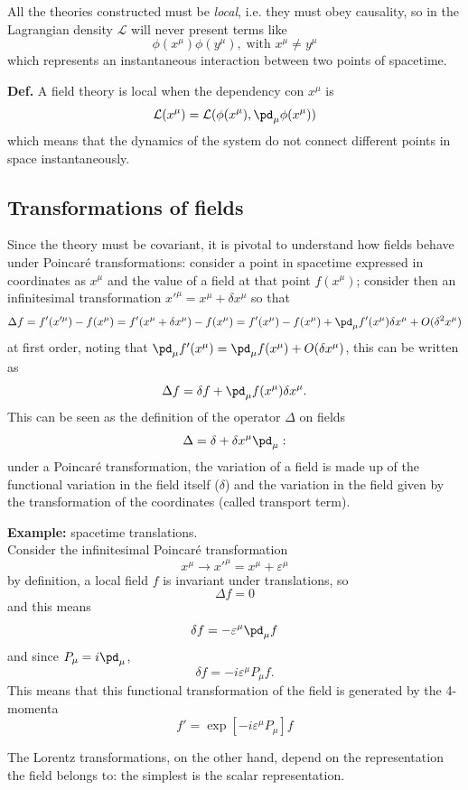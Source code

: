 All the theories constructed must be \textit{local}, i.e. they must obey causality,
so in the Lagrangian density $\mathcal{L}$ will never present terms like
$$\phi(x^\mu)\phi(y^\mu),\;\text{with }x^\mu\neq y^\mu$$
which represents an instantaneous interaction between two points of spacetime.

\textbf{Def.} A field theory is local when the dependency con $x^\mu$ is
$$\mathcal{L}(x^\mu) =\mathcal{L}(\phi(x^\mu),\pd_\mu\phi(x^\mu))$$
which means that the dynamics of the system do not connect different points in space
instantaneously.

\subsection{Transformations of fields}
Since the theory must be covariant, it is pivotal to understand how fields
behave under Poincaré transformations: consider a point in spacetime expressed in
coordinates as $x^\mu$ and the value of a field at that point $f(x^\mu)$; consider
then an infinitesimal transformation $x'^\mu = x^\mu+\delta x^\mu$ so that
$$\Delta f = f'(x'^\mu) - f(x^\mu) = f'(x^\mu+\delta x^\mu) - f(x^\mu) = f'(x^\mu)
-f(x^\mu) + \pd_\mu f'(x^\mu)\delta x^\mu + O(\delta^2 x^\mu)
$$
at first order, noting that $\pd_\mu f'(x^\mu) = \pd_\mu f(x^\mu) + O(\delta x^\mu)$,
this can be written as
$$\Delta f = \delta f +\pd_\mu f(x^\mu)\delta x^\mu.$$
This can be seen as the definition of the operator $\Delta$ on fields
$$\Delta = \delta + \delta x^\mu \pd_\mu:$$
under a Poincaré transformation, the variation of a field is made up of the
functional variation in the field itself ($\delta$) and the variation in the field
given by the transformation of the coordinates (called transport term).

\textbf{Example:} spacetime translations.\\
Consider the infinitesimal Poincaré transformation
$$x^\mu\rightarrow x'^\mu = x^\mu+\varepsilon^\mu$$
by definition, a local field $f$ is invariant under translations, so
$$\Delta f = 0$$
and this means
$$\delta f = - \varepsilon^\mu\pd_\mu f$$
and since $P_\mu = i\pd_\mu$, 
$$\delta f =-i\varepsilon^\mu P_\mu f.$$
This means that this functional transformation of the field is generated by the
4-momenta
$$f' = \exp\left[-i\varepsilon^\mu P_\mu\right]f$$

The Lorentz transformations, on the other hand, depend on the representation the field
belongs to: the simplest is the scalar representation.

